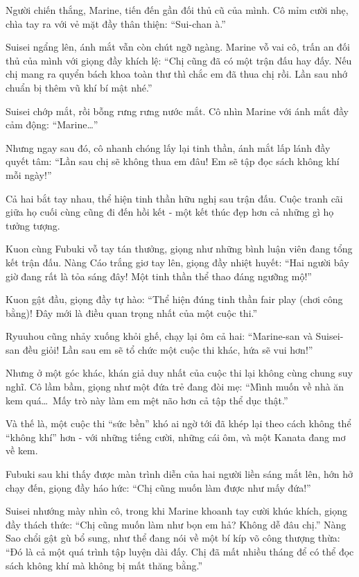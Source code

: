 \documentclass[../main.tex]{subfiles}
\begin{document}
Người chiến thắng, Marine, tiến đến gần đối thủ cũ của mình. Cô mỉm cười nhẹ, chìa tay ra với vẻ mặt đầy thân thiện: ``Sui-chan à.''

Suisei ngẩng lên, ánh mắt vẫn còn chút ngỡ ngàng. Marine vỗ vai cô, trấn an đối thủ của mình với giọng đầy khích lệ: ``Chị cũng đã có một trận đấu hay đấy. Nếu chị mang ra quyển bách khoa toàn thư thì chắc em đã thua chị rồi. Lần sau nhớ chuẩn bị thêm vũ khí bí mật nhé.''

Suisei chớp mắt, rồi bỗng rưng rưng nước mắt. Cô nhìn Marine với ánh mắt đầy cảm động: ``Marine\dots''

Nhưng ngay sau đó, cô nhanh chóng lấy lại tinh thần, ánh mắt lấp lánh đầy quyết tâm: ``Lần sau chị sẽ không thua em đâu! Em sẽ tập đọc sách không khí mỗi ngày!''

Cả hai bắt tay nhau, thể hiện tinh thần hữu nghị sau trận đấu. Cuộc tranh cãi giữa họ cuối cùng cũng đi đến hồi kết - một kết thúc đẹp hơn cả những gì họ tưởng tượng.


Kuon cùng Fubuki vỗ tay tán thưởng, giọng như những bình luận viên đang tổng kết trận đấu. Nàng Cáo trắng giơ tay lên, giọng đầy nhiệt huyết: ``Hai người bây giờ đang rất là tỏa sáng đây! Một tinh thần thể thao đáng ngưỡng mộ!''

Kuon gật đầu, giọng đầy tự hào: ``Thể hiện đúng tinh thần fair play (chơi công bằng)! Đây mới là điều quan trọng nhất của một cuộc thi.''

Ryuuhou cũng nhảy xuống khỏi ghế, chạy lại ôm cả hai: ``Marine-san và Suisei-san đều giỏi! Lần sau em sẽ tổ chức một cuộc thi khác, hứa sẽ vui hơn!''

Nhưng ở một góc khác, khán giả duy nhất của cuộc thi lại không cùng chung suy nghĩ. Cô lầm bầm, giọng như một đứa trẻ đang đòi mẹ: ``Mình muốn về nhà ăn kem quá\dots\ Mấy trò này làm em mệt não hơn cả tập thể dục thật.''

Và thế là, một cuộc thi ``sức bền'' khó ai ngờ tới đã khép lại theo cách không thể ``không khí'' hơn - với những tiếng cười, những cái ôm, và một Kanata đang mơ về kem.

\omk

Fubuki sau khi thấy được màn trình diễn của hai người liền sáng mắt lên, hớn hở chạy đến, giọng đầy háo hức: ``Chị cũng muốn làm được như mấy đứa!''

Suisei nhướng mày nhìn cô, trong khi Marine khoanh tay cười khúc khích, giọng đầy thách thức: ``Chị cũng muốn làm như bọn em hả? Không dễ đâu chị.'' Nàng Sao chổi gật gù bổ sung, như thể đang nói về một bí kíp võ công thượng thừa: ``Đó là cả một quá trình tập luyện dài đấy. Chị đã mất nhiều tháng để có thể đọc sách không khí mà không bị mất thăng bằng.''
\end{document}
